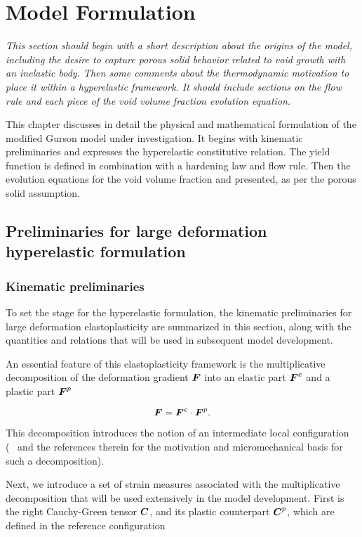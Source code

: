 \chapter{Model Formulation}
\label{model-form}

\textit{This section should begin with a short description about the
  origins of the model, including the desire to capture porous solid
  behavior related to void growth with an inelastic body. Then some
  comments about the thermodynamic motivation to place it within a
  hyperelastic framework. It should include sections on the flow rule
  and each piece of the void volume fraction evolution equation.}

This chapter discusses in detail the physical and mathematical
formulation of the modified Gurson model under investigation. It
begins with kinematic preliminaries and expresses the hyperelastic
constitutive relation. The yield function is defined in combination
with a hardening law and flow rule. Then the evolution equations for
the void volume fraction and presented, as per the porous solid
assumption.

\section{Preliminaries for large deformation hyperelastic formulation}

\subsection{Kinematic preliminaries}
To set the stage for the hyperelastic formulation, the kinematic
preliminaries for large deformation elastoplasticity are summarized in
this section, along with the quantities and relations that will be
used in subsequent model development.

An essential feature of this elastoplasticity framework is the
multiplicative decomposition of the deformation gradient ${\boldsymbol{F}}$ into an
elastic part ${\boldsymbol{F}}^e$ and a plastic part ${\boldsymbol{F}}^p$

\begin{equation}
  {\boldsymbol{F}} = {\boldsymbol{F}}^e \cdot {\boldsymbol{F}}^p.
\end{equation}

This decomposition introduces the notion of an intermediate local
configuration (\cf\ \cite{SimoHughes:98} and the references therein
for the motivation and micromechanical basis for such a
decomposition).

Next, we introduce a set of strain measures associated with the
multiplicative decomposition that will be used extensively in the
model development. First is the right Cauchy-Green tensor ${\boldsymbol{C}}$, and
its plastic counterpart ${\boldsymbol{C}}^p$, which are defined in the reference
configuration

